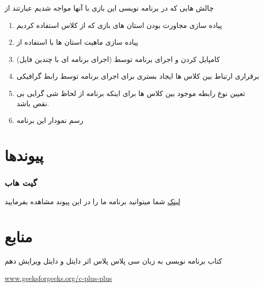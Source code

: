 \documentclass[pdf,titlepage,a4paper]{report}
\begin{document}
	چالش هایی که در برنامه نویسی این بازی با آنها مواجه شدیم عبارتند از 
	\begin{enumerate}
		\item	پیاده سازی مجاورت بودن استان های بازی که از کلاس   استفاده کردیم 
		\item پیاده سازی ماهیت استان ها با استفاده از  
		\item کامپایل کردن و اجرای برنامه توسط  (اجرای برنامه ای با چندین فایل)
    	\item برقراری ارتباط بین کلاس ها  ایجاد بستری برای اجرای برنامه توسط رابط گرافیکی 
	    \item تعیین نوع رابطه موجود بین کلاس ها برای اینکه برنامه از لحاظ شی گرایی بی نقص باشد.
		\item رسم نمودار این برنامه
	\end{enumerate}

	\newpage
		
	\part{پیوندها}
	\section{گیت هاب}
	\href{https://github.com/Matin0789/Condottiere-.git}{لینک}
     شما میتوانید برنامه ما را در این پیوند مشاهده بفرمایید 
	\newpage
	
	
	
	\part{منابع}
	\begin{itemize}
		\item کتاب برنامه نویسی به زبان سی پلاس پلاس اثر دایتل و دایتل ویرایش دهم\\
	\begin{latin}
		\item \href{https://www.geeksforgeeks.org/c-plus-plus/}{www.geeksforgeeks.org/c-plus-plus}
	\end{latin}
	\end{itemize}
	
	
\end{document}

